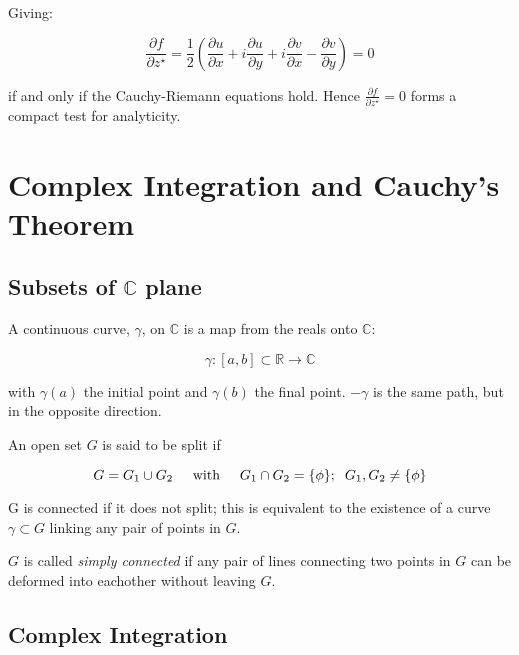 \documentclass{physics_notes}
\begin{document}
Giving:

\[ \frac{\partial f}{\partial z^\star} = \frac{1}{2}\left(\frac{\partial u}{\partial x} + i\frac{\partial u}{\partial y} + i\frac{\partial v}{\partial x} - \frac{\partial v}{\partial y}\right) = 0 \]

if and only if the Cauchy-Riemann equations hold. Hence $\frac{\partial f}{\partial z^\star} = 0$ forms a compact test for analyticity. 

\section{Complex Integration and Cauchy's Theorem}

\subsection{Subsets of $\mathbb{C}$ plane}

A continuous curve, $\gamma$, on $\mathbb{C}$ is a map from the reals onto $\mathbb{C}$:

\begin{equation*}
\gamma : \left[a,b\right] \subset \mathbb{R} \longrightarrow \mathbb{C}
\end{equation*}

with $\gamma (a)$ the initial point and $\gamma (b)$ the final point. $-\gamma$ is the same path, but in the opposite direction.

An open set $G$ is said to be split if 

\begin{equation*}
G = G_1 \cup G_2 \hspace{.5cm} \text{with} \hspace{.5cm} G_1 \cap G_2 = \{\phi\}; \hspace{.2cm} G_1 , G_2 \neq \{\phi\}
\end{equation*}

G is connected if it does not split; this is equivalent to the existence of a curve $\gamma \subset G$ linking any pair of points in $G$.

$G$ is called \emph{simply connected} if any pair of lines connecting two points in $G$ can be deformed into eachother without leaving $G$.

\subsection{Complex Integration }
\end{document}
